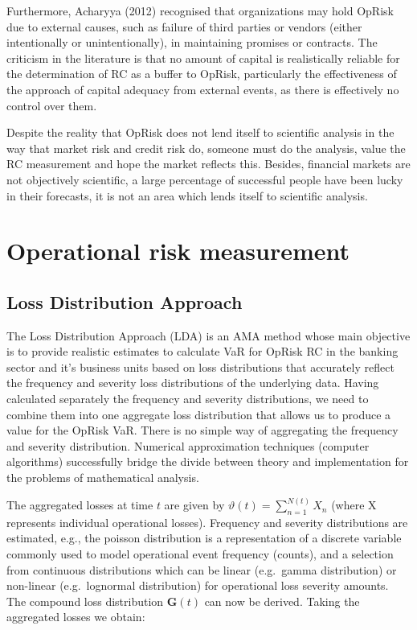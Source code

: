 \documentclass[]{DissertateUSU}
\begin{document}
Furthermore, Acharyya (2012) recognised that organizations may hold
OpRisk due to external causes, such as failure of third parties or
vendors (either intentionally or unintentionally), in maintaining
promises or contracts. The criticism in the literature is that no amount
of capital is realistically reliable for the determination of RC as a
buffer to OpRisk, particularly the effectiveness of the approach of
capital adequacy from external events, as there is effectively no
control over them.\medskip

Despite the reality that OpRisk does not lend itself to scientific
analysis in the way that market risk and credit risk do, someone must do
the analysis, value the RC measurement and hope the market reflects
this. Besides, financial markets are not objectively scientific, a large
percentage of successful people have been lucky in their forecasts, it
is not an area which lends itself to scientific analysis.\medskip

\section{Operational risk measurement}
\label{sec:Operational risk measurement}\subsection{Loss Distribution Approach}

The Loss Distribution Approach (LDA) is an AMA method whose main
objective is to provide realistic estimates to calculate VaR for OpRisk
RC in the banking sector and it's business units based on loss
distributions that accurately reflect the frequency and severity loss
distributions of the underlying data. Having calculated separately the
frequency and severity distributions, we need to combine them into one
aggregate loss distribution that allows us to produce a value for the
OpRisk VaR. There is no simple way of aggregating the frequency and
severity distribution. Numerical approximation techniques (computer
algorithms) successfully bridge the divide between theory and
implementation for the problems of mathematical analysis. \medskip

The aggregated losses at time \(t\) are given by
\(\vartheta(t) = \sum_{n=1}^{N(t)} X_{n}\) (where X represents
individual operational losses). Frequency and severity distributions are
estimated, e.g., the poisson distribution is a representation of a
discrete variable commonly used to model operational event frequency
(counts), and a selection from continuous distributions which can be
linear (e.g.~gamma distribution) or non-linear (e.g.~lognormal
distribution) for operational loss severity amounts. The compound loss
distribution \(\mathbf{G}(t)\) can now be derived. Taking the aggregated
losses we obtain:
\end{document}
